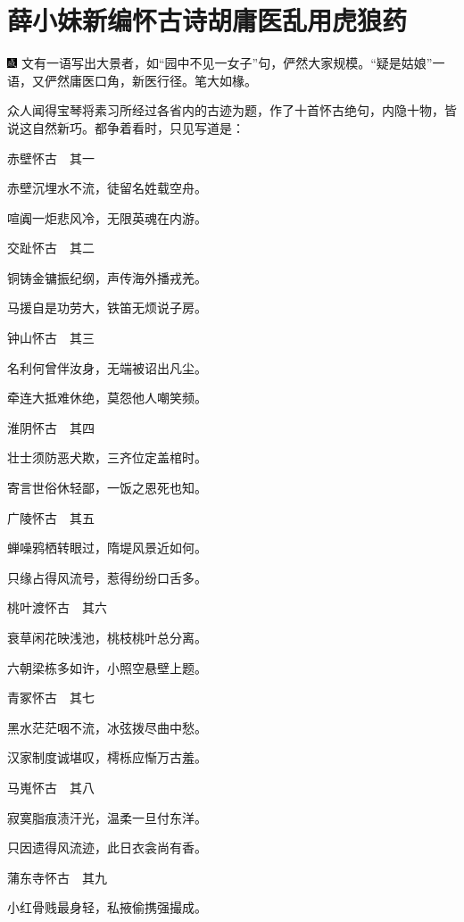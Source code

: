 

\chapter{薛小妹新编怀古诗\hspace{.5em}胡庸医乱用虎狼药}

{\includegraphics[width=3mm]{../Images/00005}  \kaishu 文有一语写出大景者，如``园中不见一女子''句，俨然大家规模。``疑是姑娘''一语，又俨然庸医口角，新医行径。笔大如椽。}

众人闻得宝琴将素习所经过各省内的古迹为题，作了十首怀古绝句，内隐十物，皆说这自然新巧。都争着看时，只见写道是：

赤壁怀古　其一

赤壁沉埋水不流，徒留名姓载空舟。

喧阗一炬悲风冷，无限英魂在内游。

交趾怀古　其二

铜铸金镛振纪纲，声传海外播戎羌。

马援自是功劳大，铁笛无烦说子房。

钟山怀古　其三

名利何曾伴汝身，无端被诏出凡尘。

牵连大抵难休绝，莫怨他人嘲笑频。

淮阴怀古　其四

壮士须防恶犬欺，三齐位定盖棺时。

寄言世俗休轻鄙，一饭之恩死也知。

广陵怀古　其五

蝉噪鸦栖转眼过，隋堤风景近如何。

只缘占得风流号，惹得纷纷口舌多。

桃叶渡怀古　其六

衰草闲花映浅池，桃枝桃叶总分离。

六朝梁栋多如许，小照空悬壁上题。

青冢怀古　其七

黑水茫茫咽不流，冰弦拨尽曲中愁。

汉家制度诚堪叹，樗栎应惭万古羞。

马嵬怀古　其八

寂寞脂痕渍汗光，温柔一旦付东洋。

只因遗得风流迹，此日衣衾尚有香。

蒲东寺怀古　其九

小红骨贱最身轻，私掖偷携强撮成。

